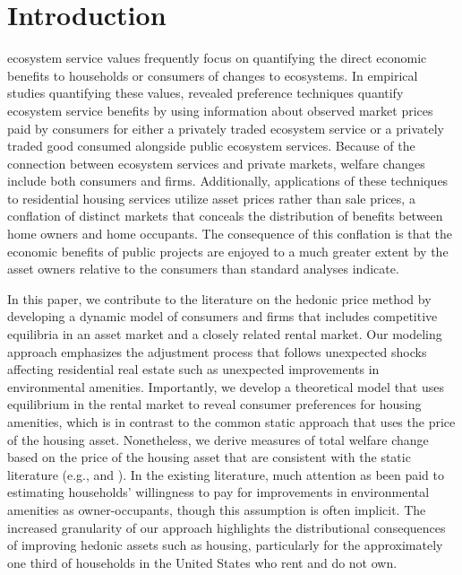 \documentclass[ecta,nameyear,draft]{econsocart}
\theoremstyle{plain}
\theoremstyle{remark}
\begin{document}
\section{Introduction}

 ecosystem service values frequently focus on quantifying the direct economic benefits to households or consumers of changes to ecosystems. In empirical studies quantifying these values, revealed preference techniques quantify ecosystem service benefits by using information about observed market prices paid by consumers for either a privately traded ecosystem service or a privately traded good consumed alongside public ecosystem services. Because of the connection between ecosystem services and private markets, welfare changes include both consumers and firms. Additionally, applications of these techniques to residential housing services utilize asset prices rather than sale prices, a conflation of distinct markets that conceals the distribution of benefits between home owners and home occupants. The consequence of this conflation is that the economic benefits of public projects are enjoyed to a much greater extent by the asset owners relative to the consumers than standard analyses indicate. 

In this paper, we contribute to the literature on the hedonic price method by developing a dynamic model of consumers and firms that includes competitive equilibria in an asset market and a closely related rental market. Our modeling approach emphasizes the adjustment process that follows unexpected shocks affecting residential real estate such as unexpected improvements in environmental amenities. Importantly, we develop a theoretical model that uses equilibrium in the rental market to reveal consumer preferences for housing amenities, which is in contrast to the common static approach that uses the price of the housing asset. Nonetheless, we derive measures of total welfare change based on the price of the housing asset that are consistent with the static literature (e.g., \cite{freeman99} and \cite{freeman14}). In the existing literature, much attention as been paid to estimating households' willingness to pay for improvements in environmental amenities as owner-occupants, though this assumption is often implicit. The increased granularity of our approach highlights the distributional consequences of improving hedonic assets such as housing, particularly for the approximately one third of households in the United States who rent and do not own. 
\end{document}
